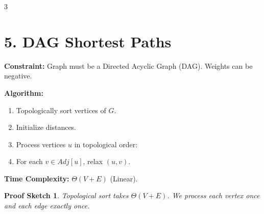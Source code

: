 \documentclass[10pt, a4paper, landscape]{article}
\newtheorem*{proof_sketch}{Proof Sketch}
\begin{document}
\begin{multicols}{3}
\section*{5. DAG Shortest Paths}
\textbf{Constraint:} Graph must be a Directed Acyclic Graph (DAG). Weights can be negative.

\textbf{Algorithm:}
\begin{enumerate}[leftmargin=*]
    \item Topologically sort vertices of $G$.
    \item Initialize distances.
    \item Process vertices $u$ in topological order:
    \item \quad For each $v \in Adj[u]$, relax $(u, v)$.
\end{enumerate}

\textbf{Time Complexity:} $\Theta(V + E)$ (Linear).
\begin{proof_sketch}
Topological sort takes $\Theta(V+E)$. We process each vertex once and each edge exactly once.
\end{proof_sketch}

\end{multicols}
\end{document}
